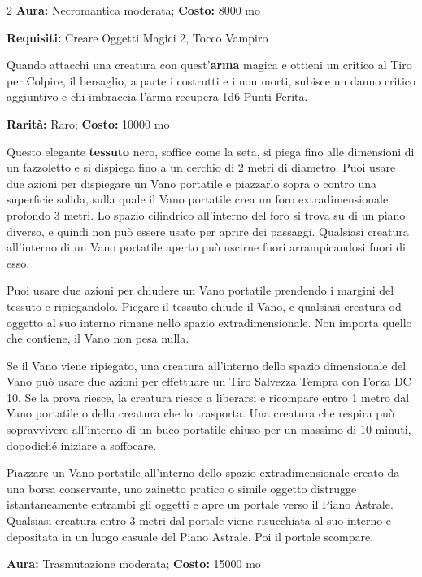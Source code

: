 \begin{multicols}{2}
\textbf{Aura:} Necromantica moderata; \textbf{Costo:} 8000 mo

\textbf{Requisiti:} Creare Oggetti Magici 2, Tocco Vampiro

Quando attacchi una creatura con quest'\textbf{arma} magica e ottieni un critico al Tiro per Colpire, il bersaglio, a parte i costrutti e i non morti, subisce un danno critico aggiuntivo e chi imbraccia l'arma recupera 1d6 Punti Ferita.


\textbf{Rarità:} Raro; \textbf{Costo:} 10000 mo

Questo elegante \textbf{tessuto} nero, soffice come la seta, si piega fino alle dimensioni di un fazzoletto e si dispiega fino a un cerchio di 2 metri di diametro. Puoi usare due azioni per dispiegare un Vano portatile e piazzarlo sopra o contro una superficie solida, sulla quale il Vano portatile crea un foro extradimensionale profondo 3 metri. Lo spazio cilindrico all'interno del foro si trova su di un piano diverso, e quindi non può essere usato per aprire dei passaggi. Qualsiasi creatura all'interno di un Vano portatile aperto può uscirne fuori arrampicandosi fuori di esso.

Puoi usare due azioni per chiudere un Vano portatile prendendo i margini del tessuto e ripiegandolo. Piegare il tessuto chiude il Vano, e qualsiasi creatura od oggetto al suo interno rimane nello spazio extradimensionale. Non importa quello che contiene, il Vano non pesa nulla.

Se il Vano viene ripiegato, una creatura all'interno dello spazio dimensionale del Vano può usare due azioni per effettuare un Tiro Salvezza Tempra con Forza DC 10. Se la prova riesce, la creatura riesce a liberarsi e ricompare entro 1 metro dal Vano portatile o della creatura che lo trasporta. Una creatura che respira può sopravvivere all'interno di un buco portatile chiuso per un massimo di 10 minuti, dopodiché iniziare a soffocare.

Piazzare un Vano portatile all'interno dello spazio extradimensionale creato da una borsa conservante, uno zainetto pratico o simile oggetto distrugge istantaneamente entrambi gli oggetti e apre un portale verso il Piano Astrale. Qualsiasi creatura entro 3 metri dal portale viene risucchiata al suo interno e depositata in un luogo casuale del Piano Astrale. Poi il portale scompare.


\textbf{Aura:} Trasmutazione moderata; \textbf{Costo:} 15000 mo


\end{multicols}
